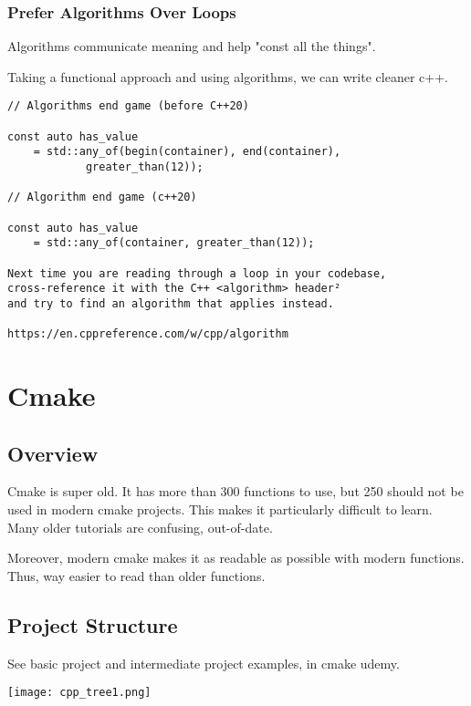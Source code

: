 \documentclass[openany]{report}
\begin{document}
\subsection{Prefer Algorithms Over Loops}

Algorithms communicate meaning and help "const all the things".

Taking a functional approach and using algorithms, we can write cleaner c++.

\begin{verbatim}
// Algorithms end game (before C++20)

const auto has_value
    = std::any_of(begin(container), end(container), 
            greater_than(12));

// Algorithm end game (c++20)

const auto has_value
    = std::any_of(container, greater_than(12));

Next time you are reading through a loop in your codebase,
cross-reference it with the C++ <algorithm> header²
and try to find an algorithm that applies instead.

https://en.cppreference.com/w/cpp/algorithm
\end{verbatim}
\chapter{Cmake}

\section{Overview}

Cmake is super old. It has more than 300 functions to use, but 250 should not be used in modern cmake projects. 
This makes it particularly difficult to learn. Many older tutorials are confusing, out-of-date.

Moreover, modern cmake makes it as readable as possible with modern functions. Thus, way easier to read than older
functions.

\section{Project Structure}

See basic project and intermediate project examples, in cmake udemy.

\begin{center}
    \texttt{[image: cpp\_tree1.png]}
\end{center}
\end{document}
